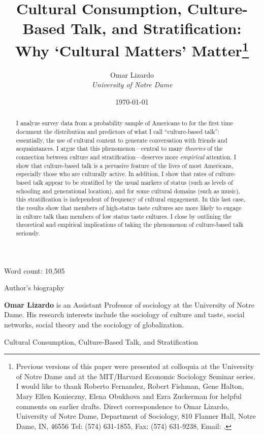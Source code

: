 \documentclass[11pt]{article}
\begin{document}
\title{Cultural Consumption, Culture-Based Talk, and Stratification:  Why `Cultural Matters' Matter\footnote{Previous versions of this paper were presented at colloquia at the University of Notre Dame and at the MIT/Harvard Economic Sociology Seminar series. I would like to thank Roberto Fernandez, Robert Fishman, Gene Halton, Mary Ellen Konieczny, Elena Obukhova and Ezra Zuckerman for helpful comments on earlier drafts.  Direct correspondence to Omar Lizardo, University of Notre Dame, Department of Sociology, 810 Flanner Hall, Notre Dame, IN, 46556  Tel: (574) 631-1855, Fax: (574) 631-9238, Email: .}}

\author{Omar Lizardo \\ \textit{University of Notre Dame}}


\date{\today}


\maketitle

\begin{center}
	Word count: 10,505
\end{center}

\newpage
\begin{center}
	{\large Author's biography}
\end{center}
{\bf Omar Lizardo} is an Assistant Professor of sociology at the University of Notre Dame.  His research interests include the sociology of culture and taste, social networks, social theory and the sociology of globalization.

\newpage
\begin{center}
	{\large Cultural Consumption, Culture-Based Talk, and Stratification}
\end{center}
\begin{abstract}
\small I analyze survey data from a probability sample of Americans to  for the first time document the distribution and predictors of what I call ``culture-based talk'': essentially, the use of cultural content to generate conversation with friends and acquaintances.  I argue that this phenomenon---central to many \emph{theories} of the connection between culture and stratification---deserves more \emph{empirical} attention. I show that culture-based talk is a pervasive feature of the lives of most Americans, especially those who are culturally active. In addition, I show that rates of culture-based talk appear to be stratified by the usual markers of status (such as levels of schooling and generational location), and for some cultural domains (such as music), this stratification is independent of frequency of cultural engagement.  In this last case, the results show that members of high-status taste cultures are more likely to engage in culture talk than members of low status taste cultures.  I close by outlining the theoretical and empirical implications of taking the phenomenon of culture-based talk seriously. 
\end{abstract}
\end{document}
